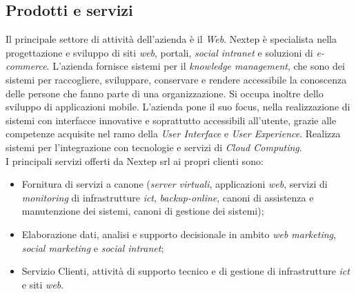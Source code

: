 \subsection{Prodotti e servizi}
Il principale settore di attività dell'azienda è il \emph{Web}. Nextep è specialista nella progettazione e sviluppo di siti \emph{web}, portali, \emph{social intranet} e soluzioni di \emph{e-commerce}. L'azienda fornisce sistemi per il \emph{knowledge management}, che sono dei sistemi per raccogliere, sviluppare, conservare e rendere accessibile la conoscenza delle persone che fanno parte di una organizzazione. Si occupa inoltre dello sviluppo di  applicazioni mobile. L'azienda pone il suo focus, nella realizzazione di sistemi con interfacce innovative e soprattutto accessibili all'utente, grazie alle competenze acquisite nel ramo della \emph{User Interface} e \emph{User Experience}. Realizza sistemi per l'integrazione con tecnologie e servizi di \emph{Cloud Computing}.\\
I principali servizi offerti da Nextep srl ai propri clienti sono:
\begin{itemize}
\item Fornitura di servizi a canone (\emph{server virtuali}, applicazioni \emph{web}, servizi di \emph{monitoring} di infrastrutture \emph{\gls{ict}}, \emph{backup-online}, canoni di assistenza e manutenzione dei sistemi, canoni di gestione dei sistemi);
\item Elaborazione dati, analisi e supporto decisionale in ambito \emph{web marketing}, \emph{social marketing} e \emph{social intranet};
\item Servizio Clienti, attività di supporto tecnico e di gestione di infrastrutture \emph{\gls{ict}} e siti \emph{web}.
\end{itemize}
